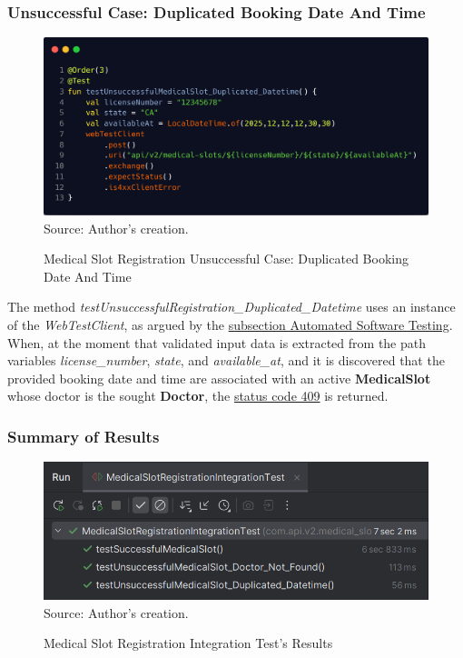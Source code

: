 \subsubsection{Unsuccessful Case: Duplicated Booking Date And Time}

\begin{figure}[H]
	\centering
	\caption{Medical Slot Registration Unsuccessful Case: Duplicated Booking Date And Time}
	\includegraphics[width=1\linewidth]{figures/medical_slot_registration_unsuccessful_integration_test_duplicated_datetime.png}
	\footnotesize Source: Author's creation.
	\label{fig:medical_slot_registration_unsuccessful_integration_test_duplicated_datetime}
\end{figure}

The method \textit{testUnsuccessfulRegistration\_Duplicated\_Datetime} uses an instance of the \textit{WebTestClient}, as argued by the \hyperref[subsection:automated_software_testing]{subsection Automated Software Testing}. When, at the moment that validated input data is extracted from the path variables \textit{license\_number}, \textit{state}, and \textit{available\_at}, and it is discovered that the provided booking date and time are associated with an active \textbf{MedicalSlot} whose doctor is the sought \textbf{Doctor}, the \hyperref[tab:summary_http_status_codes]{status code 409} is returned.

\subsubsection{Summary of Results}

\begin{figure}[H]
	\centering
	\caption{Medical Slot Registration Integration Test's Results}
	\includegraphics[width=1\linewidth]{figures/results_medical_slot_registration_integration_test.PNG}
	\footnotesize Source: Author's creation.
	\label{fig:results_medical_slot_registration_integration_test}
\end{figure}

